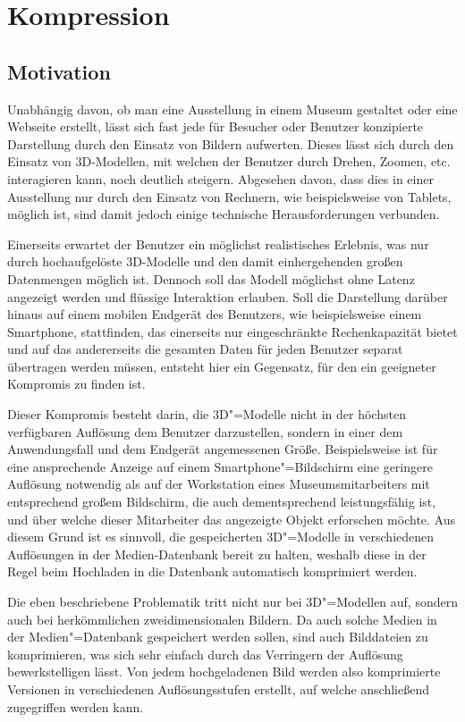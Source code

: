 \section{Kompression}\label{sec:compression}

\subsection{Motivation}

Unabhängig davon, ob man eine Ausstellung in einem Museum gestaltet oder eine Webseite erstellt, lässt sich fast jede für Besucher oder Benutzer konzipierte Darstellung durch den Einsatz von Bildern aufwerten. Dieses lässt sich durch den Einsatz von 3D-Modellen, mit welchen der Benutzer durch Drehen, Zoomen, etc. interagieren kann, noch deutlich steigern. Abgesehen davon, dass dies in einer Ausstellung nur durch den Einsatz von Rechnern, wie beispielsweise von Tablets, möglich ist, sind damit jedoch einige technische Herausforderungen verbunden.

Einerseits erwartet der Benutzer ein möglichst realistisches Erlebnis, was nur durch hochaufgelöste 3D-Modelle und den damit einhergehenden großen Datenmengen möglich ist. Dennoch soll das Modell möglichst ohne Latenz angezeigt werden und flüssige Interaktion erlauben. Soll die Darstellung darüber hinaus auf einem mobilen Endgerät des Benutzers, wie beispielsweise einem Smartphone, stattfinden, das einerseits nur eingeschränkte Rechenkapazität bietet und auf das andererseits die gesamten Daten für jeden Benutzer separat übertragen werden müssen, entsteht hier ein Gegensatz, für den ein geeigneter Kompromis zu finden ist.

Dieser Kompromis besteht darin, die 3D"=Modelle nicht in der höchsten verfügbaren Auflösung dem Benutzer darzustellen, sondern in einer dem Anwendungsfall und dem Endgerät angemessenen Größe. Beispielsweise ist für eine ansprechende Anzeige auf einem Smartphone"=Bildschirm eine geringere Auflösung notwendig als auf der Workstation eines Museumsmitarbeiters mit entsprechend großem Bildschirm, die auch dementsprechend leistungsfähig ist, und über welche dieser Mitarbeiter das angezeigte Objekt erforschen möchte. Aus diesem Grund ist es sinnvoll, die gespeicherten 3D"=Modelle in verschiedenen Auflösungen in der Medien-Datenbank bereit zu halten, weshalb diese in der Regel beim Hochladen in die Datenbank automatisch komprimiert werden.

Die eben beschriebene Problematik tritt nicht nur bei 3D"=Modellen auf, sondern auch bei herkömmlichen zweidimensionalen Bildern. Da auch solche Medien in der Medien"=Datenbank gespeichert werden sollen, sind auch Bilddateien zu komprimieren, was sich sehr einfach durch das Verringern der Auflösung bewerkstelligen lässt. Von jedem hochgeladenen Bild werden also komprimierte Versionen in verschiedenen Auflösungsstufen erstellt, auf welche anschließend zugegriffen werden kann.

